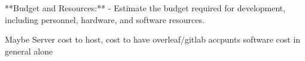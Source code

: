 **Budget and Resources:**
    - Estimate the budget required for development, including personnel, hardware, and software resources.

Maybe Server cost to host, cost to have overleaf/gitlab accpunts
software cost in general
alone